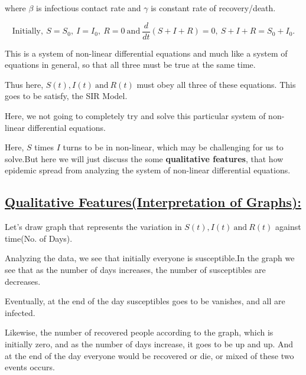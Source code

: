 \documentclass[12pt,a4paper]{article}
\begin{document}
    where $\beta$ is infectious contact rate and $\gamma$ is constant rate of recovery/death.

    \[\mbox{Initially},\  S = S_0,\ I = I_0,\ R = 0\  \mbox{and} \ \frac{d}{dt}\left(S+I+R\right) = 0,\ S+I+R = S_0 + I_0.\]


    This is a system of non-linear differential equations and much like a system of equations in general, so that all three must be true at the same time.
    \vspace*{0.5cm}

    Thus here, $S(t), I(t)\ \mbox{and}\ R(t)$ must obey all three of these equations. This goes to be satisfy, the SIR Model.
    \vspace*{0.5cm}

    Here, we not going to completely try and solve this particular system of non-linear differential equations.\vspace*{0.5cm}


    Here, $S$ times $I$ turns to be in non-linear, which may be challenging for us to solve.But here we will just discuss the some {\bf qualitative features}, that how epidemic spread from analyzing the system of  non-linear differential equations.



    \vspace*{0.2cm}

    \subsection*{\underline{\Large{{\bf Qualitative Features(Interpretation of Graphs):}}}}

    Let's draw graph that represents the variation in $S(t), I(t)\ \mbox{and}\ R(t)$ against time(No. of Days). 

    \begin{center}
        \def\svgwidth{14cm}
        
    \end{center}

    Analyzing the data, we see that initially everyone is susceptible.In the graph we see that as the number of days increases, the number of susceptibles are decreases.
    
    Eventually, at the end of the day susceptibles goes to be vanishes, and all are infected.

    \vspace*{0.5cm}

    Likewise, the number of recovered people according to the graph, which is initially zero, and as the number of days increase, it goes to be up and up. And at the end of the day everyone would be recovered or die, or mixed of these two events occurs.
\end{document}
